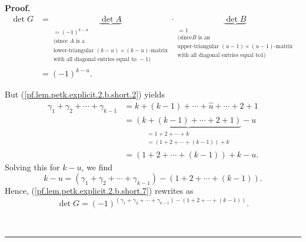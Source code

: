 \documentclass[numbers=enddot,12pt,final,onecolumn,notitlepage]{scrartcl}%
\theoremstyle{definition}
\newenvironment{proof}[1][Proof]{\noindent\textbf{#1.} }{\ \rule{0.5em}{0.5em}}
\newenvironment{vershort}{}{}
\begin{document}
\begin{proof}
\begin{vershort}
\begin{align}
\det G  &  =\underbrace{\det A}_{\substack{=\left(  -1\right)  ^{k-u}%
\\\text{(since }A\text{ is a}\\\text{lower-triangular }\left(  k-u\right)
\times\left(  k-u\right)  \text{-matrix}\\\text{with all diagonal entries
equal to }-1\text{)}}}\cdot\underbrace{\det B}_{\substack{=1\\\text{(since
}B\text{ is an}\\\text{upper-triangular }\left(  u-1\right)  \times\left(
u-1\right)  \text{-matrix}\\\text{with all diagonal entries equal to
}1\text{)}}}\nonumber\\
&  =\left(  -1\right)  ^{k-u}. \label{pf.lem.petk.explicit.2.b.short.7}%
\end{align}


But (\ref{pf.lem.petk.explicit.2.b.short.2}) yields%
\begin{align*}
\gamma_{1}+\gamma_{2}+\cdots+\gamma_{k-1}  &  =k+\left(  k-1\right)
+\cdots+\widehat{u}+\cdots+2+1\\
&  =\underbrace{\left(  k+\left(  k-1\right)  +\cdots+2+1\right)
}_{\substack{=1+2+\cdots+k\\=\left(  1+2+\cdots+\left(  k-1\right)  \right)
+k}}-u\\
&  =\left(  1+2+\cdots+\left(  k-1\right)  \right)  +k-u.
\end{align*}
Solving this for $k-u$, we find%
\[
k-u=\left(  \gamma_{1}+\gamma_{2}+\cdots+\gamma_{k-1}\right)  -\left(
1+2+\cdots+\left(  k-1\right)  \right)  .
\]
Hence, (\ref{pf.lem.petk.explicit.2.b.short.7}) rewrites as
\[
\det G=\left(  -1\right)  ^{\left(  \gamma_{1}+\gamma_{2}+\cdots+\gamma
_{k-1}\right)  -\left(  1+2+\cdots+\left(  k-1\right)  \right)  }.
\]

\end{vershort}


\end{proof}
\end{document}
